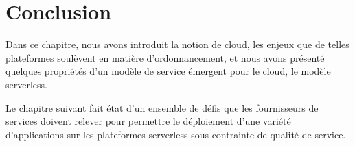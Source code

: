 \section{Conclusion}

Dans ce chapitre, nous avons introduit la notion de cloud, les enjeux que de telles plateformes soulèvent en matière d'ordonnancement, et nous avons présenté quelques propriétés d'un modèle de service émergent pour le cloud, le modèle serverless.

Le chapitre suivant fait état d'un ensemble de défis que les fournisseurs de services doivent relever pour permettre le déploiement d'une variété d'applications sur les plateformes serverless sous contrainte de qualité de service.
